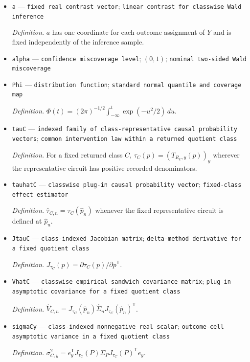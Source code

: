 \documentclass{article}
\begin{document}
\begin{itemize}
  \item \texttt{a} --- \texttt{fixed real contrast vector}; \texttt{linear contrast for classwise Wald inference}
  \par\smallskip\noindent\emph{Definition.} \(a\) has one coordinate for each outcome assignment of \(Y\) and is fixed independently of the inference sample.
  \item \texttt{alpha} --- \texttt{confidence miscoverage level}; \((0,1)\); \texttt{nominal two-\allowbreak{}sided Wald miscoverage}
  \item \texttt{Phi} --- \texttt{distribution function}; \texttt{standard normal quantile and coverage map}
  \par\smallskip\noindent\emph{Definition.} \(\Phi(t)=(2\pi)^{-1/2}\int_{-\infty}^{t}\exp(-u^2/2)\,du\).
  \item \texttt{tauC} --- \texttt{indexed family of class-\allowbreak{}representative causal probability vectors}; \texttt{common intervention law within a returned quotient class}
  \par\smallskip\noindent\emph{Definition.} For a fixed returned class \(C\), \(\tau_C(p)=(T_{R_C,y}(p))_y\) wherever the representative circuit has positive recorded denominators.
  \item \texttt{tauhatC} --- \texttt{classwise plug-\allowbreak{}in causal probability vector}; \texttt{fixed-\allowbreak{}class effect estimator}
  \par\smallskip\noindent\emph{Definition.} \(\widehat\tau_{C,n}=\tau_C(\widehat p_n)\) whenever the fixed representative circuit is defined at \(\widehat p_n\).
  \item \texttt{JtauC} --- \texttt{class-\allowbreak{}indexed Jacobian matrix}; \texttt{delta-\allowbreak{}method derivative for a fixed quotient class}
  \par\smallskip\noindent\emph{Definition.} \(J_{\tau_C}(p)=\partial\tau_C(p)/\partial p^{\mathsf T}\).
  \item \texttt{VhatC} --- \texttt{classwise empirical sandwich covariance matrix}; \texttt{plug-\allowbreak{}in asymptotic covariance for a fixed quotient class}
  \par\smallskip\noindent\emph{Definition.} \(\widehat V_{C,n}=J_{\tau_C}(\widehat p_n)\widehat\Sigma_nJ_{\tau_C}(\widehat p_n)^{\mathsf T}\).
  \item \texttt{sigmaCy} --- \texttt{class-\allowbreak{}indexed nonnegative real scalar}; \texttt{outcome-\allowbreak{}cell asymptotic variance in a fixed quotient class}
  \par\smallskip\noindent\emph{Definition.} \(\sigma_{C,y}^2=e_y^{\mathsf T}J_{\tau_C}(P)\Sigma_PJ_{\tau_C}(P)^{\mathsf T}e_y\).
\end{itemize}
\end{document}

